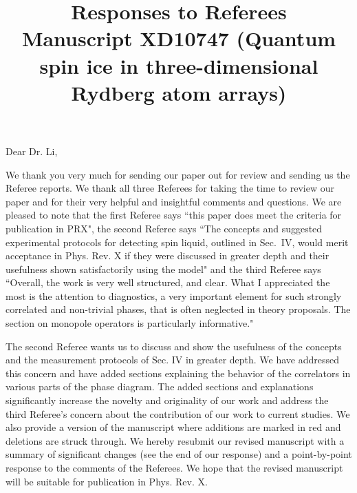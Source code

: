 \documentclass[
onecolumn,
superscriptaddress,
longbibliography,
nofootinbib,
 amsmath,amssymb,
 aps,
prb
]{revtex4-2}
\begin{document}
\title{Responses to Referees \\Manuscript XD10747 (Quantum spin ice in three-dimensional Rydberg atom arrays)}

\maketitle


Dear Dr. Li,

We thank you very much for sending our paper out for review and sending us the Referee reports.
We thank all three Referees for taking the time to review our paper and for their very helpful and insightful comments and questions.
We are pleased to note that the first Referee says ``this paper does meet the criteria for publication in PRX", the second Referee says ``The concepts and suggested experimental protocols for detecting spin liquid, outlined in Sec.~IV, would merit acceptance in Phys. Rev. X if they were discussed in greater depth and their usefulness shown satisfactorily
using the model" and the third Referee says ``Overall, the work is very well structured, and clear. What I appreciated the most is the attention to diagnostics,
a very important element for such strongly correlated and non-trivial phases, that is often neglected in theory
proposals. The section on monopole operators is particularly informative."

The second Referee wants us to discuss and show the usefulness of the concepts and the measurement protocols of Sec. IV in greater depth. We have addressed this concern and have added sections explaining the behavior of the correlators in various parts of the phase diagram.
The added sections and explanations significantly increase the novelty and originality of our work and address the third Referee's concern about the contribution of our work to current studies. We also provide a version of the manuscript where additions are marked in red and deletions are struck through.
We hereby resubmit our revised manuscript with a summary of significant changes (see the end of our response) and a point-by-point response to the comments of the Referees. 
We hope that the revised manuscript will be suitable for publication in Phys. Rev. X.
\end{document}
